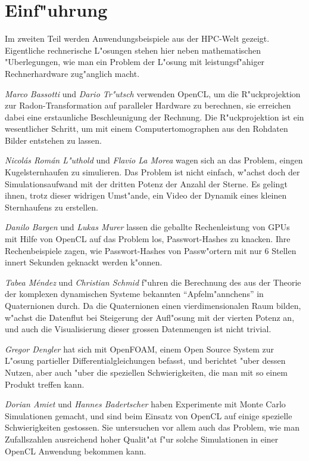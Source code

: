 \chapter*{Einf"uhrung}
Im zweiten Teil werden Anwendungsbeispiele aus der HPC-Welt gezeigt.
Eigentliche rechnerische L"osungen stehen hier neben mathematischen
"Uberlegungen, wie man ein Problem der L"osung mit leistungsf"ahiger
Rechnerhardware zug"anglich macht.

{\em Marco Bassotti} und {\em Dario Tr"utsch} verwenden OpenCL,
um die R"uckprojektion zur Radon-Transformation
auf paralleler Hardware zu berechnen, sie erreichen dabei eine erstaunliche
Beschleunigung der Rechnung.
Die R"uckprojektion ist ein wesentlicher Schritt, um mit einem
Computertomographen aus den Rohdaten Bilder entstehen zu lassen.

{\em Nicol\'as Rom\'an L"uthold} und {\em Flavio La Morea}
wagen sich an das Problem,
eingen Kugelsternhaufen zu simulieren. Das Problem ist nicht einfach,
w"achst doch der Simulationsaufwand mit der dritten Potenz der Anzahl
der Sterne.
Es gelingt ihnen, trotz dieser widrigen Umst"ande, ein Video der Dynamik
eines kleinen Sternhaufens zu erstellen.

{\em Danilo Bargen} und {\em Lukas Murer} lassen die geballte Rechenleistung von GPUs
mit Hilfe von OpenCL auf das Problem los, Passwort-Hashes zu knacken.
Ihre Rechenbeispiele zagen, wie Passwort-Hashes von Passw"ortern mit nur
6 Stellen innert Sekunden geknackt werden k"onnen.

{\em Tabea M\'endez} und {\em Christian Schmid} f"uhren die Berechnung des aus der
Theorie der komplexen dynamischen Systeme bekannten ``Apfelm"annchens''
in Quaternionen durch. Da die Quaternionen einen vierdimensionalen
Raum bilden, w"achst die Datenflut bei Steigerung der Aufl"osung mit
der vierten Potenz an, und auch die Visualisierung dieser grossen Datenmengen
ist nicht trivial.

{\em Gregor Dengler} hat sich mit OpenFOAM, einem Open Source
System zur L"osung partieller Differentialgleichungen befasst, und berichtet
"uber dessen Nutzen, aber auch "uber die speziellen Schwierigkeiten,
die man mit so einem Produkt treffen kann.

{\em Dorian Amiet} und {\em Hannes Badertscher} haben Experimente mit
Monte Carlo Simulationen gemacht, und sind beim Einsatz von OpenCL auf
einige spezielle Schwierigkeiten gestossen. Sie untersuchen vor allem auch
das Problem, wie man Zufallszahlen ausreichend hoher Qualit"at f"ur 
solche Simulationen in einer OpenCL Anwendung bekommen kann.

